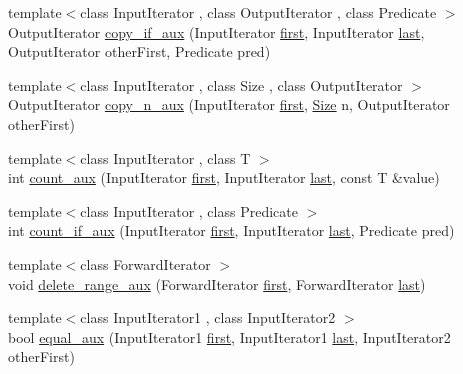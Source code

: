 \begin{DoxyCompactItemize}
\item 
{\footnotesize template$<$class Input\+Iterator , class Output\+Iterator , class Predicate $>$ }\\Output\+Iterator \hyperlink{namespaceprism_a06d95b48370d6b89936a81e08f7ed8d7}{copy\+\_\+if\+\_\+aux} (Input\+Iterator \hyperlink{namespaceprism_ae3fb7a1926a9e8e59300cd5e370470da}{first}, Input\+Iterator \hyperlink{namespaceprism_abe4956c4e865f55ca126b7fb973b5078}{last}, Output\+Iterator other\+First, Predicate pred)
\item 
{\footnotesize template$<$class Input\+Iterator , class Size , class Output\+Iterator $>$ }\\Output\+Iterator \hyperlink{namespaceprism_a305d5bebe30595a5d4705a6cef37b52a}{copy\+\_\+n\+\_\+aux} (Input\+Iterator \hyperlink{namespaceprism_ae3fb7a1926a9e8e59300cd5e370470da}{first}, \hyperlink{classprism_1_1_size}{Size} n, Output\+Iterator other\+First)
\item 
{\footnotesize template$<$class Input\+Iterator , class T $>$ }\\int \hyperlink{namespaceprism_a161f644c4e266d280a770bb0c9fbe045}{count\+\_\+aux} (Input\+Iterator \hyperlink{namespaceprism_ae3fb7a1926a9e8e59300cd5e370470da}{first}, Input\+Iterator \hyperlink{namespaceprism_abe4956c4e865f55ca126b7fb973b5078}{last}, const T \&value)
\item 
{\footnotesize template$<$class Input\+Iterator , class Predicate $>$ }\\int \hyperlink{namespaceprism_a8d72a3b00c7e3e537c82829965732dad}{count\+\_\+if\+\_\+aux} (Input\+Iterator \hyperlink{namespaceprism_ae3fb7a1926a9e8e59300cd5e370470da}{first}, Input\+Iterator \hyperlink{namespaceprism_abe4956c4e865f55ca126b7fb973b5078}{last}, Predicate pred)
\item 
{\footnotesize template$<$class Forward\+Iterator $>$ }\\void \hyperlink{namespaceprism_a25e9f7e103a3f2ae15048eb75dc6af97}{delete\+\_\+range\+\_\+aux} (Forward\+Iterator \hyperlink{namespaceprism_ae3fb7a1926a9e8e59300cd5e370470da}{first}, Forward\+Iterator \hyperlink{namespaceprism_abe4956c4e865f55ca126b7fb973b5078}{last})
\item 
{\footnotesize template$<$class Input\+Iterator1 , class Input\+Iterator2 $>$ }\\bool \hyperlink{namespaceprism_ac6dc9c68afaa8d8490148baf121bfc1c}{equal\+\_\+aux} (Input\+Iterator1 \hyperlink{namespaceprism_ae3fb7a1926a9e8e59300cd5e370470da}{first}, Input\+Iterator1 \hyperlink{namespaceprism_abe4956c4e865f55ca126b7fb973b5078}{last}, Input\+Iterator2 other\+First)

\end{DoxyCompactItemize}
